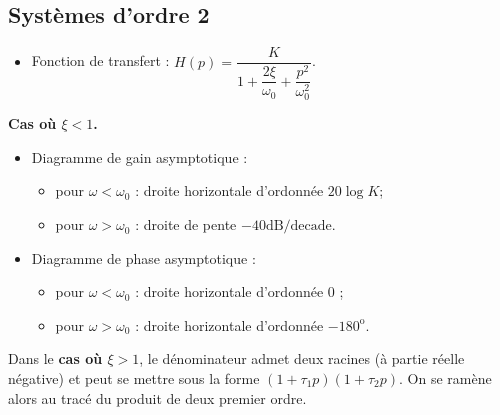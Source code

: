 \subsection{Systèmes d'ordre 2}


\begin{resultat}
\begin{itemize}
\item Fonction de transfert : $H(p)=\dfrac{K}{1+\dfrac{2\xi}{\omega_0}+\dfrac{p^2}{\omega_0^2}}$.
\end{itemize}
\begin{center}
\textbf{Cas où $\xi<1$.}
\end{center}
\begin{itemize}
\item Diagramme de gain asymptotique : 
\begin{itemize}
\item pour $\omega<\omega_0$ : droite horizontale d'ordonnée $20 \log K$;
\item pour $\omega>\omega_0$ : droite de pente $-{40}\text{dB/decade}$.
\end{itemize}
\item Diagramme de phase asymptotique : 
\begin{itemize}
\item pour $\omega<\omega_0$ : droite horizontale d'ordonnée 0 \degre;
\item pour $\omega>\omega_0$ : droite horizontale d'ordonnée $-180^{\text{o}}$.
\end{itemize}
\end{itemize}


Dans le \textbf{cas où $\xi>1$}, le dénominateur admet deux racines (à partie réelle négative) et peut se mettre sous la forme  $\left(1+\tau_1 p \right)\left(1+\tau_2 p \right)$. On se ramène alors au tracé du produit de deux premier ordre.
\end{resultat}

